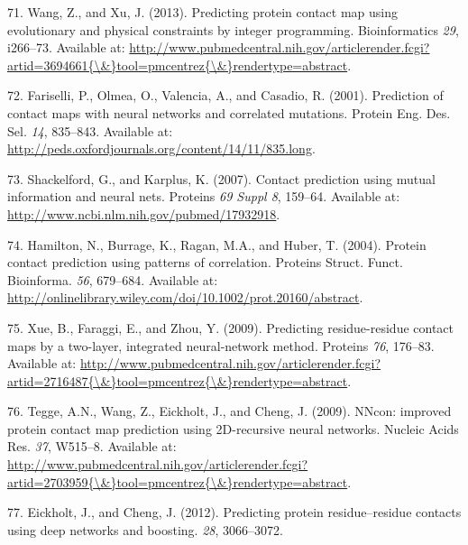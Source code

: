 \documentclass[11pt,a4paper,twoside]{book}
\theoremstyle{definition}
\theoremstyle{definition}
\theoremstyle{remark}
\begin{document}
\hypertarget{ref-Wang2013}{}
71. Wang, Z., and Xu, J. (2013). Predicting protein contact map using
evolutionary and physical constraints by integer programming.
Bioinformatics \emph{29}, i266--73. Available at:
\href{http://www.pubmedcentral.nih.gov/articlerender.fcgi?artid=3694661\%7B/\&\%7Dtool=pmcentrez\%7B/\&\%7Drendertype=abstract}{http://www.pubmedcentral.nih.gov/articlerender.fcgi?artid=3694661\{\textbackslash{}\&\}tool=pmcentrez\{\textbackslash{}\&\}rendertype=abstract}.

\hypertarget{ref-Fariselli2001a}{}
72. Fariselli, P., Olmea, O., Valencia, A., and Casadio, R. (2001).
Prediction of contact maps with neural networks and correlated
mutations. Protein Eng. Des. Sel. \emph{14}, 835--843. Available at:
\url{http://peds.oxfordjournals.org/content/14/11/835.long}.

\hypertarget{ref-Shackelford2007}{}
73. Shackelford, G., and Karplus, K. (2007). Contact prediction using
mutual information and neural nets. Proteins \emph{69 Suppl 8}, 159--64.
Available at: \url{http://www.ncbi.nlm.nih.gov/pubmed/17932918}.

\hypertarget{ref-Hamilton2004a}{}
74. Hamilton, N., Burrage, K., Ragan, M.A., and Huber, T. (2004).
Protein contact prediction using patterns of correlation. Proteins
Struct. Funct. Bioinforma. \emph{56}, 679--684. Available at:
\url{http://onlinelibrary.wiley.com/doi/10.1002/prot.20160/abstract}.

\hypertarget{ref-Xue2009a}{}
75. Xue, B., Faraggi, E., and Zhou, Y. (2009). Predicting
residue-residue contact maps by a two-layer, integrated neural-network
method. Proteins \emph{76}, 176--83. Available at:
\href{http://www.pubmedcentral.nih.gov/articlerender.fcgi?artid=2716487\%7B/\&\%7Dtool=pmcentrez\%7B/\&\%7Drendertype=abstract}{http://www.pubmedcentral.nih.gov/articlerender.fcgi?artid=2716487\{\textbackslash{}\&\}tool=pmcentrez\{\textbackslash{}\&\}rendertype=abstract}.

\hypertarget{ref-Tegge2009a}{}
76. Tegge, A.N., Wang, Z., Eickholt, J., and Cheng, J. (2009). NNcon:
improved protein contact map prediction using 2D-recursive neural
networks. Nucleic Acids Res. \emph{37}, W515--8. Available at:
\href{http://www.pubmedcentral.nih.gov/articlerender.fcgi?artid=2703959\%7B/\&\%7Dtool=pmcentrez\%7B/\&\%7Drendertype=abstract}{http://www.pubmedcentral.nih.gov/articlerender.fcgi?artid=2703959\{\textbackslash{}\&\}tool=pmcentrez\{\textbackslash{}\&\}rendertype=abstract}.

\hypertarget{ref-Eickholt2012}{}
77. Eickholt, J., and Cheng, J. (2012). Predicting protein
residue--residue contacts using deep networks and boosting. \emph{28},
3066--3072.
\end{document}
